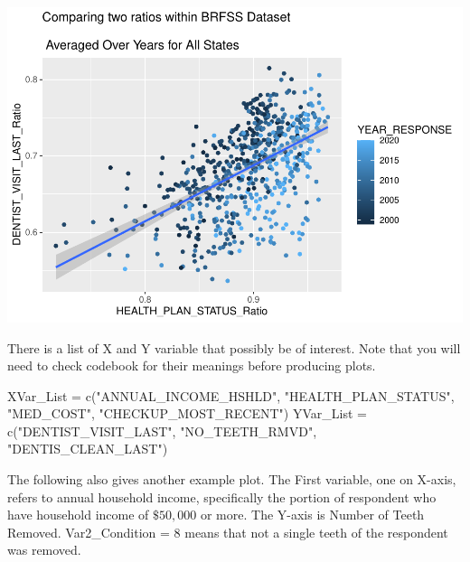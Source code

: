 \documentclass[
]{article}
\newenvironment{Shaded}{\begin{snugshade}}{\end{snugshade}}
\newcommand{\FunctionTok}[1]{\textcolor[rgb]{0.00,0.00,0.00}{#1}}
\newcommand{\NormalTok}[1]{#1}
\newcommand{\OtherTok}[1]{\textcolor[rgb]{0.56,0.35,0.01}{#1}}
\newcommand{\StringTok}[1]{\textcolor[rgb]{0.31,0.60,0.02}{#1}}
\begin{document}
\includegraphics{BRFSS_Graphic_Reproduction_files/figure-latex/unnamed-chunk-6-1.pdf}

There is a list of X and Y variable that possibly be of interest. Note
that you will need to check codebook for their meanings before producing
plots.

\begin{Shaded}
\begin{Highlighting}[]
\NormalTok{XVar\_List }\OtherTok{=} \FunctionTok{c}\NormalTok{(}\StringTok{"ANNUAL\_INCOME\_HSHLD"}\NormalTok{, }\StringTok{"HEALTH\_PLAN\_STATUS"}\NormalTok{, }
              \StringTok{"MED\_COST"}\NormalTok{, }\StringTok{"CHECKUP\_MOST\_RECENT"}\NormalTok{)}
\NormalTok{YVar\_List }\OtherTok{=} \FunctionTok{c}\NormalTok{(}\StringTok{"DENTIST\_VISIT\_LAST"}\NormalTok{, }\StringTok{"NO\_TEETH\_RMVD"}\NormalTok{, }\StringTok{"DENTIS\_CLEAN\_LAST"}\NormalTok{)}
\end{Highlighting}
\end{Shaded}

The following also gives another example plot. The First variable, one
on X-axis, refers to annual household income, specifically the portion
of respondent who have household income of \(\$50,000\) or more. The
Y-axis is Number of Teeth Removed. Var2\_Condition = 8 means that not a
single teeth of the respondent was removed.
\end{document}
